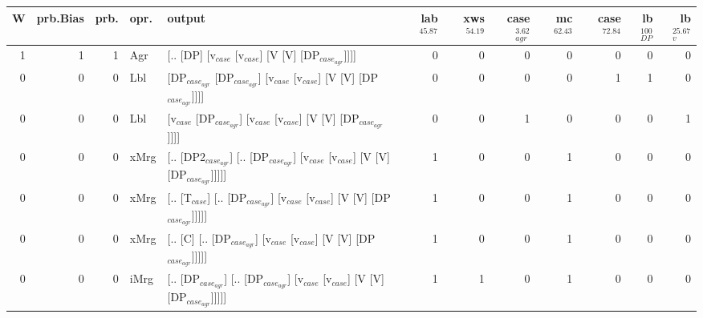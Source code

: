 \begin{tabularx}{\linewidth}{rrrlXrrrrrrr}
\hline
   W &   prb.Bias &   prb. & opr.   & output                                                                                                  &   lab$^{45.87}$ &   xws$^{54.19}$ &   case$_{agr}^{3.62}$ &   mc$^{62.43}$ &   case$^{72.84}$ &   lb$_{DP}^{100}$ &   lb$_{v}^{25.67}$ \\
\hline
   1 &       1 &   1 & Agr  & [.. [DP] [v$_{case}$ [v$_{case}$] [V [V] [DP$_{case_{agr}}$]]]]                                                       &             0 &             0 &                  0 &            0 &              0 &                0 &              0 \\
   0 &       0 &   0 & Lbl  & [DP$_{case_{agr}}$ [DP$_{case_{agr}}$] [v$_{case}$ [v$_{case}$] [V [V] [DP$_{case_{agr}}$]]]]                                     &             0 &             0 &                  0 &            0 &              1 &                1 &              0 \\
   0 &       0 &   0 & Lbl  & [v$_{case}$ [DP$_{case_{agr}}$] [v$_{case}$ [v$_{case}$] [V [V] [DP$_{case_{agr}}$]]]]                                          &             0 &             0 &                  1 &            0 &              0 &                0 &              1 \\
   0 &       0 &   0 & xMrg & [.. [DP2$_{case_{agr}}$] [.. [DP$_{case_{agr}}$] [v$_{case}$ [v$_{case}$] [V [V] [DP$_{case_{agr}}$]]]]]                          &             1 &             0 &                  0 &            1 &              0 &                0 &              0 \\
   0 &       0 &   0 & xMrg & [.. [T$_{case}$] [.. [DP$_{case_{agr}}$] [v$_{case}$ [v$_{case}$] [V [V] [DP$_{case_{agr}}$]]]]]                                &             1 &             0 &                  0 &            1 &              0 &                0 &              0 \\
   0 &       0 &   0 & xMrg & [.. [C] [.. [DP$_{case_{agr}}$] [v$_{case}$ [v$_{case}$] [V [V] [DP$_{case_{agr}}$]]]]]                                     &             1 &             0 &                  0 &            1 &              0 &                0 &              0 \\
   0 &       0 &   0 & iMrg & [.. [DP$_{case_{agr}}$] [.. [DP$_{case_{agr}}$] [v$_{case}$ [v$_{case}$] [V [V] [DP$_{case_{agr}}$]]]]]                           &             1 &             1 &                  0 &            1 &              0 &                0 &              0 \\

\end{tabularx}
